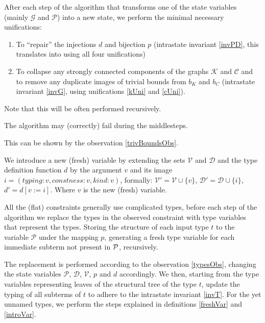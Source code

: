 \begin{defn}
    \label{middlesteps}

    After each step of the algorithm that transforms one of the state variables (mainly $\mathcal{G}$ and $\mathcal{P}$) into a new state, we perform the minimal necessary unifications:

    \begin{enumerate}
        \item To ``repair'' the injections $d$ and bijection $p$ (intrastate invariant \ref{invPD}, this translates into using all four unifications)

        \item To collapse any strongly connected components of the graphs $\mathcal{K}$ and  $\mathcal{C}$ and to remove any duplicate images of trivial bounds from $b_K$ and $b_C$ (intrastate invariant \ref{invG}, using unifications \ref{kUni} and \ref{cUni}).
    \end{enumerate}
    
    Note that this will be often performed recursively.
\end{defn}

\begin{lemma}
    The algorithm may (correctly) fail during the middlesteps.
    
    This can be shown by the observation \ref{trivBoundsObs}.
\end{lemma}

\begin{defn}
    \label{introVar}
    We introduce a new (fresh) variable by extending the sets $\mathcal{V}$ and $\mathcal{D}$
    and the type definition function $d$ by the argument $v$ and its image $i = (typing: v, constness: v, kind: v)$, formally: $\mathcal{V}' = \mathcal{V} \cup \{v\}$, $\mathcal{D}' = \mathcal{D} \cup \{i\}$, $d' = d [v := i]$. Where $v$ is the new (fresh) variable.
\end{defn}
\begin{defn}
    \label{presteps}

    All the (flat) constraints generally use complicated types, before each step of the algorithm we replace the types in the observed constraint with type variables that represent the types. Storing the structure of each input type $t$ to the variable $\mathcal P$ under the mapping $p$, generating a fresh type variable for each immediate subterm not present in $\mathcal P$, recursively.

    The replacement is performed according to the observation \ref{typesObs}, changing the state variables $\mathcal{P}$, $\mathcal{D}$, $\mathcal{V}$, $p$ and $d$ accordingly. We then, starting from the type variables representing leaves of the structural tree of the type $t$, update the typing of all subterms of $t$ to adhere to the intrastate invariant \ref{invT}. For the yet unnamed types, we perform the steps explained in definitions \ref{freshVar} and \ref{introVar}.
\end{defn}

